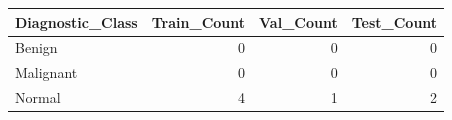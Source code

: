 \begin{tabular}{lrrr}
\toprule
Diagnostic\_Class & Train\_Count & Val\_Count & Test\_Count \\
\midrule
Benign & 0 & 0 & 0 \\
Malignant & 0 & 0 & 0 \\
Normal & 4 & 1 & 2 \\
\bottomrule
\end{tabular}
